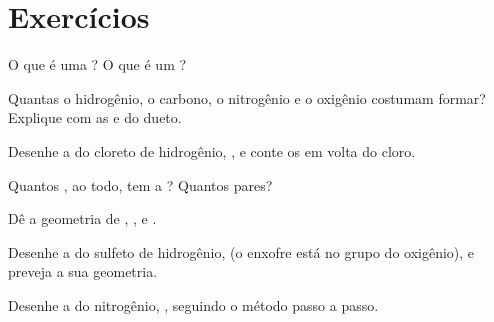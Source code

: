 \section{Exercícios}

\begin{exercise}[$\star$]\label{exo:g10:lewis-and-shape:1}
O que é uma ? O que é um ?
\end{exercise}

\begin{exercise}[$\star$]\label{exo:g10:lewis-and-shape:2}
Quantas  o hidrogênio, o carbono, o nitrogênio e o
oxigênio costumam formar? Explique com as  e do dueto.
\end{exercise}

\begin{exercise}[$\star$]\label{exo:g10:lewis-and-shape:3}
Desenhe a  do cloreto de hidrogênio, , e conte
os  em volta do cloro.
\end{exercise}

\begin{exercise}[$\star$]\label{exo:g10:lewis-and-shape:4}
Quantos , ao todo, tem a  ? Quantos
pares?
\end{exercise}

\begin{exercise}[$\star$]\label{exo:g10:lewis-and-shape:5}
Dê a geometria de , ,  e .
\end{exercise}

\begin{exercise}[$\star\star$]\label{exo:g10:lewis-and-shape:6}
Desenhe a  do sulfeto de hidrogênio,  (o
enxofre está no grupo do oxigênio), e preveja a sua geometria.
\end{exercise}

\begin{exercise}[$\star\star$]\label{exo:g10:lewis-and-shape:7}
Desenhe a  do nitrogênio, , seguindo o método
passo a passo.
\end{exercise}

